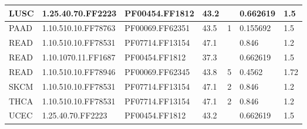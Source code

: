 \documentclass[a4paper, 11pt]{report}
\begin{document}
\begin{table}[!htbp]
\begin{tabular}{|l|l|l|l|l|l|l|}
LUSC         & 1.25.40.70.FF2223    & PF00454.FF1812  & 43.2      &             & 0.662619          & 1.5      \\ \hline
PAAD         & 1.10.510.10.FF78763  & PF00069.FF62351 & 43.5      & 1           & 0.155692          & 1.5      \\ \hline
READ         & 1.10.510.10.FF78531  & PF07714.FF13154 & 47.1      &             & 0.846             & 1.2      \\ \hline
READ         & 1.10.1070.11.FF1687  & PF00454.FF1812  & 37.3      &             & 0.662619          & 1.5      \\ \hline
READ         & 1.10.510.10.FF78946  & PF00069.FF62345 & 43.8      & 5           & 0.4562            & 1.72     \\ \hline
SKCM         & 1.10.510.10.FF78531  & PF07714.FF13154 & 47.1      & 2           & 0.846             & 1.2      \\ \hline
THCA         & 1.10.510.10.FF78531  & PF07714.FF13154 & 47.1      & 2           & 0.846             & 1.2      \\ \hline
UCEC         & 1.25.40.70.FF2223    & PF00454.FF1812  & 43.2      &             & 0.662619          & 1.5      \\ \hline
\end{tabular}
\end{table}



\newpage


\end{document}
